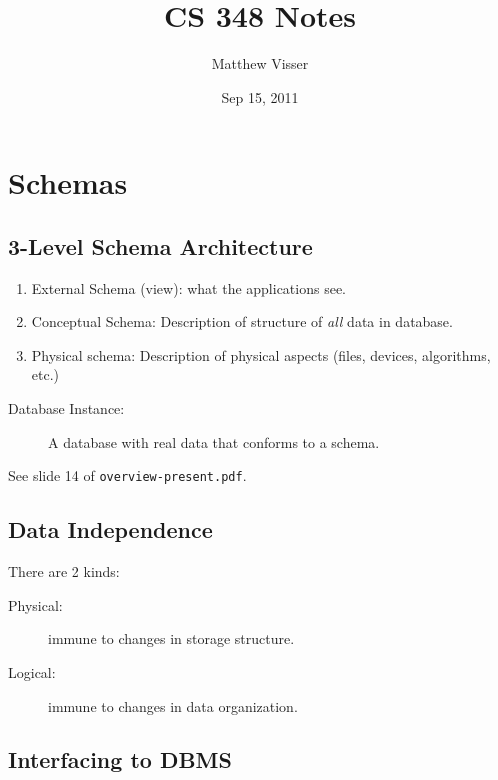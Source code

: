 \documentclass[12pt]{article}
\begin{document}
\title{CS 348 Notes}
\author{Matthew Visser}
\date{Sep 15, 2011}
\maketitle

\section*{Schemas}
\subsection*{3-Level Schema Architecture}

\begin{enumerate}
    \item External Schema (view): what the applications see.
    \item Conceptual Schema: Description of structure of \textit{all} data in
        database.
    \item Physical schema: Description of physical aspects (files, devices,
        algorithms, etc.)
\end{enumerate}

\begin{description}
    \item[Database Instance:] A database with real data that conforms to a
        schema.
\end{description}

See slide 14 of \texttt{overview-present.pdf}.

\subsection*{Data Independence}

There are 2 kinds:
\begin{description}
    \item[Physical:] immune to changes in storage structure.
    \item[Logical:] immune to changes in data organization.
\end{description}

\subsection*{Interfacing to DBMS}
\end{document}
